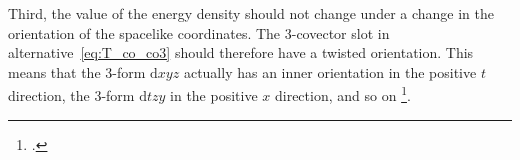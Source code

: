 \documentclass[\ifafour a4paper,12pt,\else a5paper,10pt,\fi%
onecolumn,oneside,article,%
british%
]{memoir}
\theoremstyle{remark}
\theoremstyle{innote}
\newcommand*{\citep}{\footcites}
\newcommand*{\di}{\mathrm{d}}%
\renewcommand*{\|}[1][]{\nonscript\,#1\vert\nonscript\;\mathopen{}}
\newcommand*{\sect}{\S}%
\newcommand*{\cf}{{cf.}}
\newcommand*{\en}{\epsilon}
\newcommand*{\dixyz}{\di xyz}
\newcommand*{\ditzy}{\di tzy}
\begin{document}
Third, the value of the energy density should not change under a change in
the orientation of the spacelike coordinates. The 3-covector slot in
alternative~\eqref{eq:T_co_co3} should therefore have a twisted
orientation. This means that the 3-form $\dixyz$ actually has an inner
orientation in the positive $t$ direction, the 3-form $\ditzy$ in the
positive $x$ direction, and so on \citep[To visualize this \cf][Fig.~6 and
table in \sect~II.8 p.~31]{schouten1951_r1989}[and][Fig.~22.10]{burke1985_r1987}.

\medskip
\end{document}
